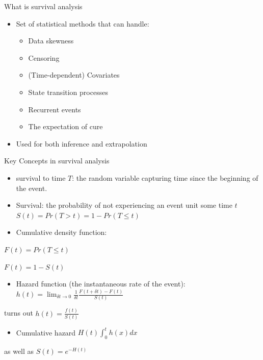 \documentclass[
  ignorenonframetext,
]{beamer}
\providecommand{\tightlist}{%
  \setlength{\itemsep}{0pt}\setlength{\parskip}{0pt}}
\begin{document}
\begin{frame}{What is survival analysis}
\protect\hypertarget{what-is-survival-analysis}{}

\begin{itemize}
\tightlist
\item
  Set of statistical methods that can handle:

  \begin{itemize}
  \tightlist
  \item
    Data skewness
  \item
    Censoring
  \item
    (Time-dependent) Covariates
  \item
    State transition processes
  \item
    Recurrent events
  \item
    The expectation of cure
  \end{itemize}
\item
  Used for both inference and extrapolation
\end{itemize}

\end{frame}

\begin{frame}{Key Concepts in survival analysis}
\protect\hypertarget{key-concepts-in-survival-analysis}{}

\begin{itemize}
\item
  survival to time \(T\): the random variable capturing time since the
  beginning of the event.
\item
  Survival: the probability of not experiencing an event unit some time
  \(t\) \(S(t) = Pr(T >t) = 1- Pr(T \leq t)\)
\item
  Cumulative density function:
\end{itemize}

\(F(t) = Pr(T \leq t)\)

\(F(t) = 1 - S(t)\)

\begin{itemize}
\tightlist
\item
  Hazard function (the instantaneous rate of the event):
  \(h(t) = \lim_{\delta t \rightarrow 0}\frac{1}{\delta t} \frac{ F(t + \delta t) - F(t)}{S(t)}\)
\end{itemize}

turns out \(h(t) = \frac{f(t)}{S(t)}\)

\begin{itemize}
\tightlist
\item
  Cumulative hazard \(H(t) \int^t_0 {h(x)dx}\)
\end{itemize}

as well as \(S(t) = e^{-H(t)}\)

\end{frame}
\end{document}
